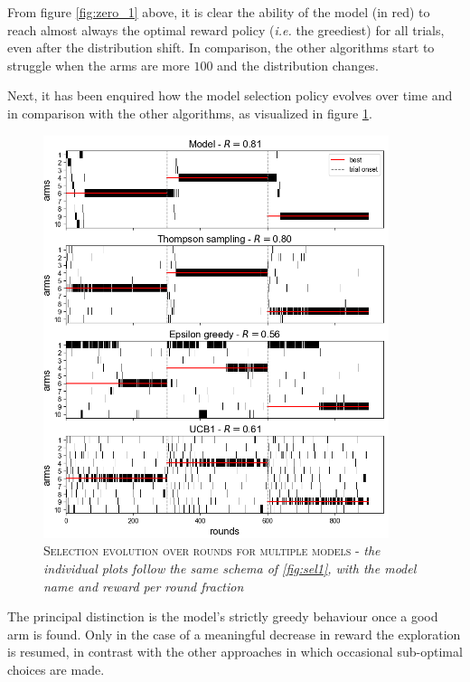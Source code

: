 \noindent From figure \ref{fig:zero_1} above, it is clear the ability of the model (in red) to reach almost always the optimal reward policy (\textit{i.e.} the greediest) for all trials, even after the distribution shift.
In comparison, the other algorithms start to struggle when the arms are more $100$ and the distribution changes.

Next, it has been enquired how the model selection policy evolves over time and in comparison with the other algorithms, as visualized in figure \ref{fig:sel2}.

\begin{figure}[h]
    \centering
    \includegraphics[width=0.9\textwidth]{figures/selections_many.png}
    \caption{\textsc{Selection evolution over rounds for multiple models} - \textit{the individual plots follow the same schema of \ref{fig:sel1}, with the model name and reward per round fraction}}
    \label{fig:sel2}
\end{figure}

\noindent The principal distinction is the model's strictly greedy behaviour once a good arm is found. Only in the case of a meaningful decrease in reward the exploration is resumed, in contrast with the other approaches in which occasional sub-optimal choices are made.



